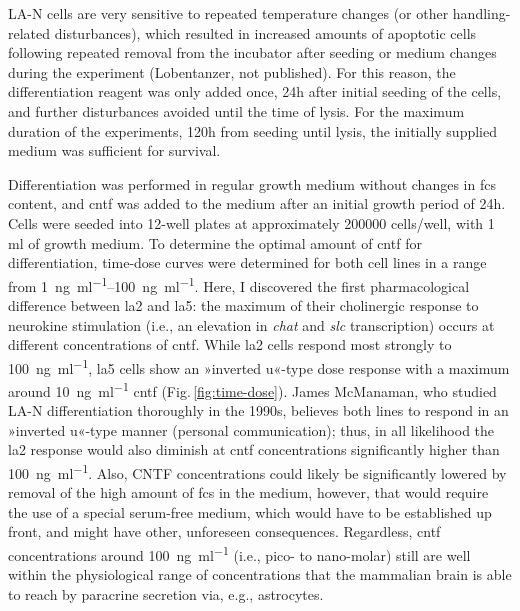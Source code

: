 \begin{method}
LA-N cells are very sensitive to repeated temperature changes (or other handling-related disturbances), which resulted in increased amounts of apoptotic cells following repeated removal from the incubator after seeding or medium changes during the experiment (Lobentanzer, not published). For this reason, the differentiation reagent was only added once, 24h after initial seeding of the cells, and further disturbances avoided until the time of lysis. For the maximum duration of the experiments, 120h from seeding until lysis, the initially supplied medium was sufficient for survival.

Differentiation was performed in regular growth medium without changes in \ac{fcs} content, and \ac{cntf} was added to the medium after an initial growth period of 24h. Cells were seeded into 12-well plates at approximately \num{200000} cells/well, with 1 ml of growth medium. To determine the optimal amount of \ac{cntf} for differentiation, time-dose curves were determined for both cell lines in a range from \SIrange{1}{100}{\nano\gram\per\milli\litre}. Here, I discovered the first pharmacological difference between \ac{la2} and \ac{la5}: the maximum of their cholinergic response to neurokine stimulation (i.e., an elevation in \textit{\ac{chat}} and \textit{\ac{slc}} transcription) occurs at different concentrations of \ac{cntf}. While \ac{la2} cells respond most strongly to \SI{100}{\nano\gram\per\milli\litre}, \ac{la5} cells show an »inverted u«-type dose response with a maximum around \SI{10}{\nano\gram\per\milli\litre} \ac{cntf} (Fig.\,\ref{fig:time-dose}). James McManaman, who studied LA-N differentiation thoroughly in the 1990s,\cite{McManaman1991} believes both lines to respond in an »inverted u«-type manner (personal communication); thus, in all likelihood the \ac{la2} response would also diminish at \ac{cntf} concentrations significantly higher than \SI{100}{\nano\gram\per\milli\litre}. Also, CNTF concentrations could likely be significantly lowered by removal of the high amount of \ac{fcs} in the medium, however, that would require the use of a special serum-free medium, which would have to be established up front, and might have other, unforeseen consequences. Regardless, \ac{cntf} concentrations around \SI{100}{\nano\gram\per\milli\litre} (i.e., pico- to nano-molar) still are well within the physiological range of concentrations that the mammalian brain is able to reach by paracrine secretion via, e.g., astrocytes.\cite{Sun2016}

\end{method}

